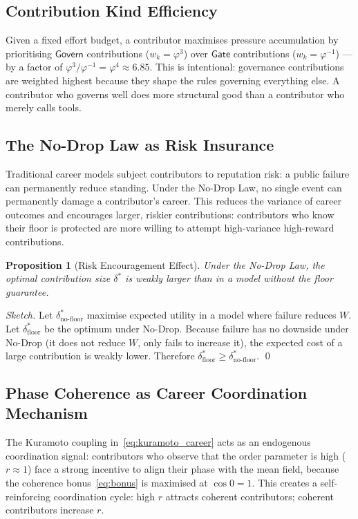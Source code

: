 \documentclass[12pt]{article}
\newtheorem{proposition}[theorem]{Proposition}
\newcommand{\PHI}{\varphi}
\newcommand{\PHIINV}{\varphi^{-1}}
\newcommand{\contrib}[1]{\mathsf{#1}}
\begin{document}
\subsection{Contribution Kind Efficiency}

Given a fixed effort budget, a contributor maximises pressure accumulation
by prioritising $\contrib{Govern}$ contributions ($w_k = \PHI^3$) over
$\contrib{Gate}$ contributions ($w_k = \PHIINV$) — by a factor of
$\PHI^3 / \PHIINV = \PHI^4 \approx 6.85$.  This is intentional:
governance contributions are weighted highest because they shape the rules
governing everything else.  A contributor who governs well does more
structural good than a contributor who merely calls tools.

\subsection{The No-Drop Law as Risk Insurance}

Traditional career models subject contributors to reputation risk: a public
failure can permanently reduce standing.  Under the No-Drop Law, no single
event can permanently damage a contributor's career.  This reduces the
variance of career outcomes and encourages larger, riskier contributions:
contributors who know their floor is protected are more willing to attempt
high-variance high-reward contributions.

\begin{proposition}[Risk Encouragement Effect]
  Under the No-Drop Law, the optimal contribution size $\delta^*$ is weakly
  larger than in a model without the floor guarantee.
\end{proposition}

\begin{proof}[Sketch]
  Let $\delta^*_\text{no-floor}$ maximise expected utility in a model where
  failure reduces $W$.  Let $\delta^*_\text{floor}$ be the optimum under
  No-Drop.  Because failure has no downside under No-Drop (it does not reduce
  $W$, only fails to increase it), the expected cost of a large contribution
  is weakly lower.  Therefore $\delta^*_\text{floor} \ge \delta^*_\text{no-floor}$.
  \qed
\end{proof}

\subsection{Phase Coherence as Career Coordination Mechanism}

The Kuramoto coupling in~\eqref{eq:kuramoto_career} acts as an endogenous
coordination signal: contributors who observe that the order parameter is high
($r \approx 1$) face a strong incentive to align their phase with the mean
field, because the coherence bonus~\eqref{eq:bonus} is maximised at $\cos 0 = 1$.
This creates a self-reinforcing coordination cycle: high $r$ attracts coherent
contributors; coherent contributors increase $r$.
\end{document}
